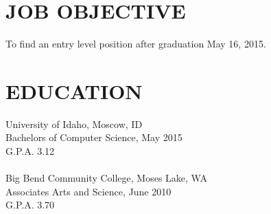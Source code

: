                                   
\begin{resume}

\section{JOB OBJECTIVE}          
    To find an entry level position after graduation May 16, 2015.          
 
\section{EDUCATION}          
    University of Idaho, Moscow, ID  \\        
    Bachelors of Computer Science, May 2015   \\       
    G.P.A. 3.12 \\ \\
    Big Bend Community College, Moses Lake, WA \\
    Associates Arts and Science, June 2010 \\
    G.P.A. 3.70 

 

\end{resume}

